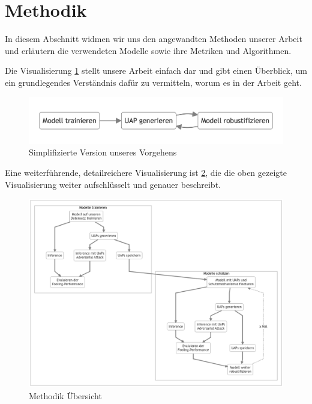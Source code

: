 \section{Methodik} 

In diesem Abschnitt widmen wir uns den angewandten Methoden unserer Arbeit und erläutern die verwendeten Modelle sowie ihre Metriken und Algorithmen.

Die Visualisierung \ref{fig:07-simplified_overview} stellt unsere Arbeit einfach dar und gibt einen Überblick, um ein grundlegendes Verständnis dafür zu vermitteln, worum es in der Arbeit geht.

\begin{figure}[H]
    \centering
    \includegraphics[width=13.5cm]{01-images/04-methodik/simplified_overview.png}
    \caption{Simplifizierte Version unseres Vorgehens}
    \label{fig:07-simplified_overview}
\end{figure}

Eine weiterführende, detailreichere Visualisierung ist \ref{fig:06-overview}, die die oben gezeigte Visualisierung weiter aufschlüsselt und genauer beschreibt.

\begin{figure}[H]
    \centering
    \includegraphics[width=\linewidth]{01-images/04-methodik/overview.png}
    \caption{Methodik Übersicht}
    \label{fig:06-overview}
\end{figure}
